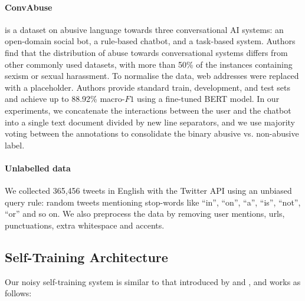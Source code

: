\documentclass[11pt,a4paper]{article}
\begin{document}
\paragraph{ConvAbuse} \citep{convabusedataset} is a dataset on abusive language towards three conversational AI systems: an open-domain social bot, a rule-based chatbot, and a task-based system. Authors find that the distribution of abuse towards conversational systems differs from other commonly used datasets, with more than 50\% of the instances containing sexism or sexual harassment. To normalise the data, web addresses were replaced with a placeholder. Authors provide standard train, development, and test sets and achieve up to 88.92\% macro-$F1$ using a fine-tuned BERT model. In our experiments, we concatenate the interactions between the user and the chatbot into a single text document divided by new line separators, and we use majority voting between the annotations to consolidate the binary abusive vs. non-abusive label.

\paragraph{Unlabelled data} We collected 365,456 tweets in English with the Twitter API using an unbiased query rule: random tweets mentioning stop-words like ``in'', ``on'', ``a'', ``is'', ``not'', ``or'' and so on. We also preprocess the data by removing user mentions, urls, punctuations, extra whitespace and accents.

\subsection{Self-Training Architecture} \label{sec:system-description}
Our noisy self-training system is similar to that introduced by \citet{noisystudent} and \citet{xie2020unsupervised}, and works as follows:
\end{document}

